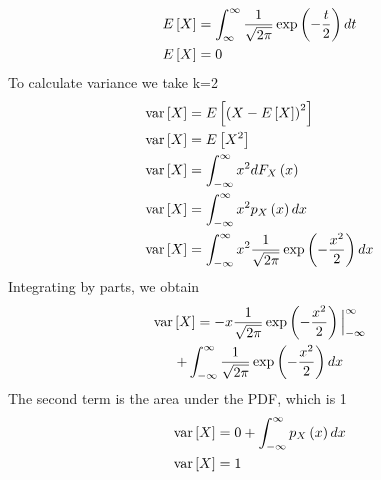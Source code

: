 \documentclass[journal,12pt,twocolumn]{IEEEtran}
\renewcommand\thesection{\arabic{section}}
\begin{document}
\begin{enumerate}[label=\thesection.\arabic*
,ref=\thesection.\theenumi]
\begin{align}
     E{}\left[X\right] &= \int_{\infty}^{\infty}
    \frac{1}{\sqrt{2\pi}}\exp\left(-\frac{t}{2}\right) dt \\
     E{}\left[X\right] &= 0
\end{align}
To calculate variance we take k=2
\begin{align}
    \text{var}{}\left[X\right] &= E{}\left[\left(X- E{}\left[X\right]\right)^2\right] \\
    \text{var}{}\left[X\right] &= E{}\left[X^2\right] \\
    \text{var}{}\left[X\right] &= \int_{-\infty}^{\infty}x^2dF_{X}\left(x\right) \\
    \text{var}{}\left[X\right] &= \int_{-\infty}^{\infty}x^2 p_{X}\left(x\right) dx \\
    \text{var}{}\left[X\right] &= \int_{-\infty}^{\infty}x^2
    \frac{1}{\sqrt{2\pi}}\exp\left(-\frac{x^2}{2}\right) dx   
\end{align}
Integrating by parts, we obtain
\begin{multline}
    \text{var}{}\left[X\right] = -x\frac{1}{\sqrt{2\pi}}\exp\left(-\frac{x^2}{2}\right)  \Big|_{-\infty}^{\infty}  \\
    + \int_{-\infty}^{\infty}
    \frac{1}{\sqrt{2\pi}}\exp\left(-\frac{x^2}{2}\right) dx   
\end{multline}
The second term is the area under the PDF, which is 1
\begin{align}
    \text{var}{}\left[X\right] &= 0 + \int_{-\infty}^{\infty}p_{X}\left(x\right)dx \\
    \text{var}{}\left[X\right] &= 1   
\end{align}

%
\end{enumerate}
\end{document}
